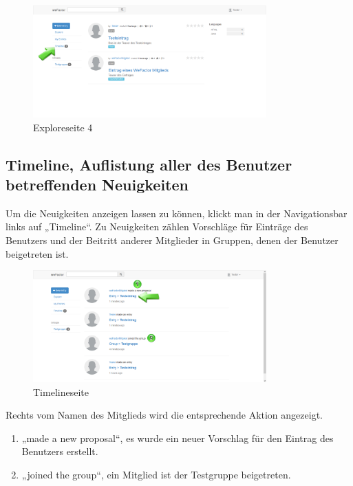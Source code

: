 \begin{figure}[H]
    \centering
    \includegraphics[width=0.8\textwidth]{Bilder/32.png}
    \caption{Exploreseite 4}
    \label{fig:exploreseite4}
\end{figure}


\subsection{Timeline, Auflistung aller des Benutzer betreffenden Neuigkeiten}

Um die Neuigkeiten anzeigen lassen zu können, klickt man in der Navigationsbar links auf „Timeline“. Zu Neuigkeiten zählen Vorschläge für Einträge des Benutzers und der Beitritt anderer Mitglieder in Gruppen, denen der Benutzer beigetreten ist.

\begin{figure}[H]
    \centering
    \includegraphics[width=0.8\textwidth]{Bilder/33.png}
    \caption{Timelineseite}
    \label{fig:timelineseite}
\end{figure}


Rechts vom Namen des Mitglieds wird die entsprechende Aktion angezeigt.

\begin{enumerate}
\item „made a new proposal“, es wurde ein neuer Vorschlag für den Eintrag des Benutzers erstellt.
\item „joined the group“, ein Mitglied ist der Testgruppe beigetreten.
\end{enumerate}

